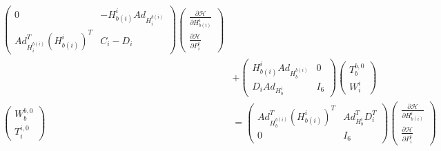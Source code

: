\documentclass[a4paper,twoside, openright,12pt]{report}
\begin{document}
{\begin{eqnarray}
\begin{aligned}
\begin{pmatrix}
0 & -H_{b(i)}^i Ad_{H_i^{b(i)}} \\
Ad_{H_i^{b(i)}}^T (H_{b(i)}^i)^T & C_i - D_i
\end{pmatrix}
\begin{pmatrix}
\frac{\partial \mathcal{H}}{\partial H_{b(i)}^i} \\ 
\frac{\partial \mathcal{H}}{\partial P_{i}^i}
\end{pmatrix}  \\
&+
\begin{pmatrix}
H_{b(i)}^i Ad_{H_b^{b(i)}} & 0 \\
D_i Ad_{H_b^i} & I_6
\end{pmatrix}
\begin{pmatrix}
T_b^{b,0} \\ W_i^i
\end{pmatrix}
 \\
\begin{pmatrix}
W_b^{b,0} \\ T_i^{i,0}
\end{pmatrix} &= 
\begin{pmatrix}
Ad_{H_b^{b(i)}}^T (H_{b(i)}^i)^T &  Ad_{H_b^i}^T D_i^T \\
 0 & I_6
\end{pmatrix}
\begin{pmatrix}
\frac{\partial \mathcal{H}}{\partial H_{b(i)}^i} \\ 
\frac{\partial \mathcal{H}}{\partial P_{i}^i}
\end{pmatrix}
\end{aligned}
\end{eqnarray}


}
\end{document}
